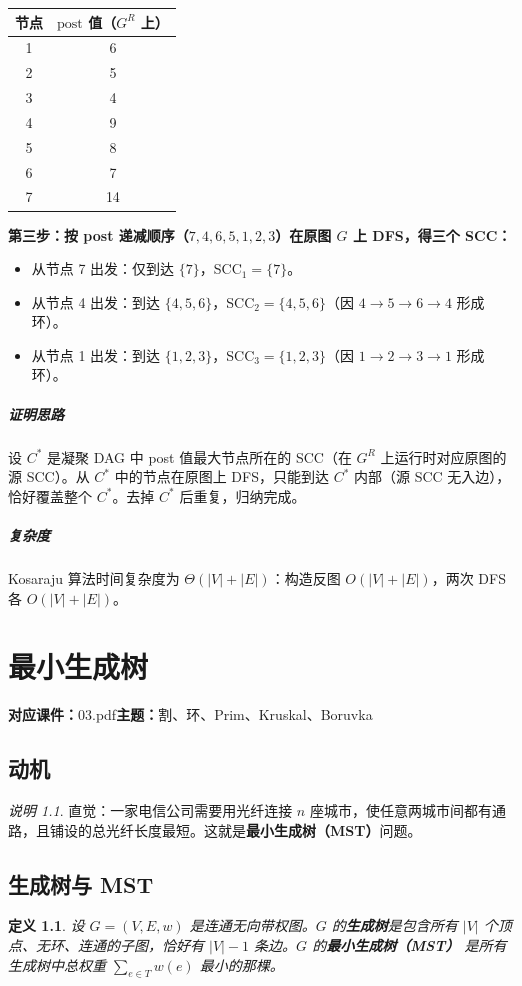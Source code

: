 \documentclass[UTF8,openany,12pt]{ctexbook}
\newtheorem{definition}{定义}[chapter]
\theoremstyle{remark}
\newtheorem{remark}{说明}[chapter]
\newcommand{\lecture}[3]{
  \chapter{#2}
  \noindent\textbf{对应课件：}#1\hfill\textbf{主题：}#3
  \vspace{0.6em}
}
\newcommand{\complexity}[1]{\paragraph{复杂度}#1}
\newcommand{\proofidea}[1]{\paragraph{证明思路}#1}
\begin{document}
\begin{center}
\begin{tabular}{@{}cc@{}}
\toprule
节点 & $\mathrm{post}$ 值（$G^R$ 上） \\
\midrule
1 & 6  \\
2 & 5  \\
3 & 4  \\
4 & 9  \\
5 & 8  \\
6 & 7  \\
7 & 14 \\
\bottomrule
\end{tabular}
\end{center}

\textbf{第三步：按 post 递减顺序（$7,4,6,5,1,2,3$）在原图 $G$ 上 DFS，得三个 SCC：}

\begin{itemize}
  \item 从节点 7 出发：仅到达 $\{7\}$，SCC$_1 = \{7\}$。
  \item 从节点 4 出发：到达 $\{4,5,6\}$，SCC$_2 = \{4,5,6\}$（因 $4\to5\to6\to4$ 形成环）。
  \item 从节点 1 出发：到达 $\{1,2,3\}$，SCC$_3 = \{1,2,3\}$（因 $1\to2\to3\to1$ 形成环）。
\end{itemize}

\proofidea{设 $C^*$ 是凝聚 DAG 中 post 值最大节点所在的 SCC（在 $G^R$ 上运行时对应原图的源 SCC）。从 $C^*$ 中的节点在原图上 DFS，只能到达 $C^*$ 内部（源 SCC 无入边），恰好覆盖整个 $C^*$。去掉 $C^*$ 后重复，归纳完成。}

\complexity{Kosaraju 算法时间复杂度为 $\Theta(|V|+|E|)$：构造反图 $O(|V|+|E|)$，两次 DFS 各 $O(|V|+|E|)$。}

\lecture{03.pdf}{最小生成树}{割、环、Prim、Kruskal、Boruvka}

\section{动机}

\begin{remark}
直觉：一家电信公司需要用光纤连接 $n$ 座城市，使任意两城市间都有通路，且铺设的总光纤长度最短。这就是\textbf{最小生成树（MST）}问题。
\end{remark}

\section{生成树与 MST}

\begin{definition}
设 $G=(V,E,w)$ 是连通无向带权图。$G$ 的\textbf{生成树}是包含所有 $|V|$ 个顶点、无环、连通的子图，恰好有 $|V|-1$ 条边。$G$ 的\textbf{最小生成树（MST）} 是所有生成树中总权重 $\sum_{e \in T} w(e)$ 最小的那棵。
\end{definition}
\end{document}
